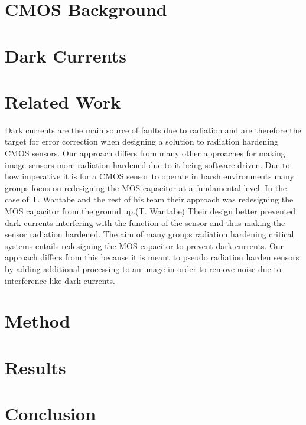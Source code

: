 \documentclass[journal]{IEEEtran}
\begin{document}
\section{CMOS Background}


\section{Dark Currents}



\section{Related Work} 
Dark currents are the main source of faults due to radiation and are therefore the target for error correction when designing a solution to radiation hardening CMOS sensors.  Our approach differs from many other approaches for making image sensors more radiation hardened due to it being software driven.  Due to how imperative it is for a CMOS sensor to operate in harsh environments many groups focus on redesigning the MOS capacitor at a fundamental level.  In the case of T. Wantabe and the rest of his team their approach was redesigning the MOS capacitor from the ground up.(T. Wantabe)  Their design better prevented dark currents interfering with the function of the sensor and thus making the sensor radiation hardened.  The aim of many groups radiation hardening critical systems entails redesigning the MOS capacitor to prevent dark currents.  Our approach differs from this because it is meant to pseudo radiation harden sensors by adding additional processing to an image in order to remove noise due to interference like dark currents.  

\section{Method}

\section{Results}

\section{Conclusion}



{\footnotesize

}
\end{document}
